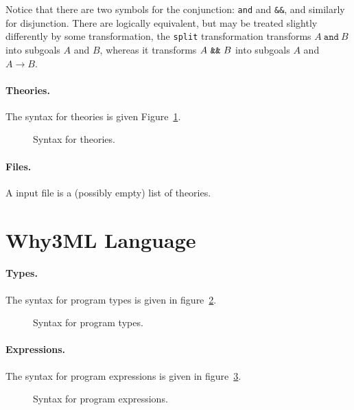Notice that there are two symbols for the conjunction: \texttt{and}
and \verb|&&|, and similarly for disjunction. There are logically
equivalent, but may be treated slightly differently by some
transformation, \eg{} the \texttt{split} transformation transforms
$A~\texttt{and}~B$ into subgoals $A$ and $B$, whereas it transforms
$A~\verb|&&|~B$ into subgoals $A$ and $A\rightarrow B$.

\paragraph{Theories.}
The syntax for theories is given Figure~\ref{fig:bnf:theory}.

\begin{figure}
  \begin{center}\framebox{}\end{center}
  \caption{Syntax for theories.}
\label{fig:bnf:theory}
\end{figure}

\paragraph{Files.}
A \why input file is a (possibly empty) list of theories.
\begin{center}\framebox{}\end{center}


\clearpage
\section{Why3ML Language}\label{sec:syntax:whyml}

\paragraph{Types.}
The syntax for program types is given in figure~\ref{fig:bnf:typev}.
\begin{figure}
  \begin{center}\framebox{}\end{center}
  \caption{Syntax for program types.}
\label{fig:bnf:typev}
\end{figure}

\paragraph{Expressions.}
The syntax for program expressions is given in figure~\ref{fig:bnf:expr}.
\begin{figure}
  \begin{center}\framebox{}\end{center}
  \caption{Syntax for program expressions.}
\label{fig:bnf:expr}
\end{figure}

